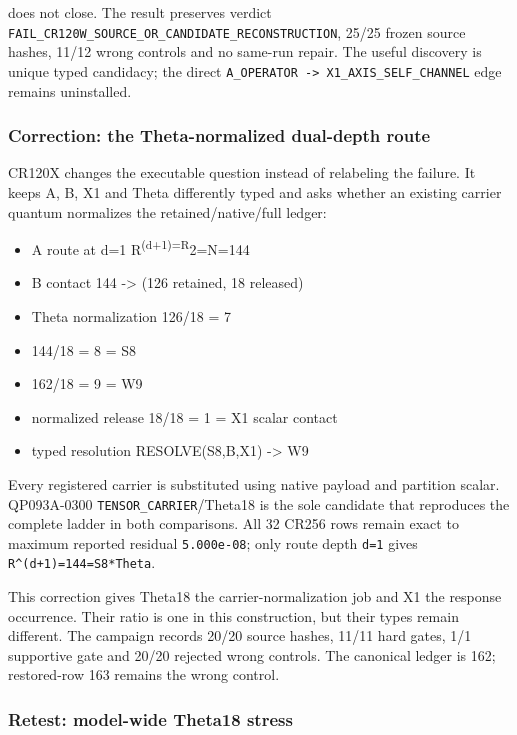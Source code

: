does not close. The result preserves verdict
\nolinkurl{FAIL_CR120W_SOURCE_OR_CANDIDATE_RECONSTRUCTION}, 25/25
frozen source hashes, 11/12 wrong controls and no same-run repair. The
useful discovery is unique typed candidacy; the direct
\texttt{A\_OPERATOR\ -\textgreater{}\ \nolinkurl{X1_AXIS_SELF}\_CHANNEL} edge
remains uninstalled.

\subsubsection{Correction: the Theta-normalized dual-depth
route}\label{viii-ch05-correction-the-theta-normalized-dual-depth-route}

CR120X changes the executable question instead of relabeling the
failure. It keeps A, B, X1 and Theta differently typed and asks whether
an existing carrier quantum normalizes the retained/native/full ledger:

\begin{itemize}
\tightlist
\item
  A route at d=1 R\textsuperscript{(d+1)=R}2=N=144
\item
  B contact 144 -\textgreater{} (126 retained, 18 released)
\item
  Theta normalization 126/18 = 7
\item
  144/18 = 8 = S8
\item
  162/18 = 9 = W9
\item
  normalized release 18/18 = 1 = X1 scalar contact
\item
  typed resolution RESOLVE(S8,B,X1) -\textgreater{} W9
\end{itemize}

Every registered carrier is substituted using native payload and
partition scalar. QP093A-0300 \texttt{TENSOR\_CARRIER}/Theta18 is the
sole candidate that reproduces the complete ladder in both comparisons.
All 32 CR256 rows remain exact to maximum reported residual
\texttt{5.000e-08}; only route depth \texttt{d=1} gives
\texttt{R\^{}(d+1)=144=S8*Theta}.

This correction gives Theta18 the carrier-normalization job and X1 the
response occurrence. Their ratio is one in this construction, but their
types remain different. The campaign records 20/20 source hashes, 11/11
hard gates, 1/1 supportive gate and 20/20 rejected wrong controls. The
canonical ledger is 162; restored-row 163 remains the wrong control.

\subsubsection{Retest: model-wide Theta18
stress}\label{viii-ch05-retest-model-wide-theta18-stress}

